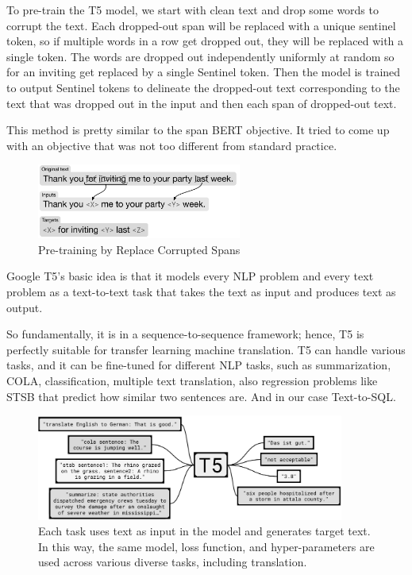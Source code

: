 To pre-train the T5 model, we start with clean text and drop some words to corrupt the text. Each dropped-out span will be replaced with a unique sentinel token, so if multiple words in a row get dropped out, they will be replaced with a single token. The words are dropped out independently uniformly at random so for an inviting get replaced by a single Sentinel token. Then the model is trained to output Sentinel tokens to delineate the dropped-out text corresponding to the text that was dropped out in the input and then each span of dropped-out text.

This method is pretty similar to the span BERT objective. It tried to come up with an objective that was not too different from standard practice.

\begin{figure}[H]
    \centering
    \includegraphics[width=0.6\textwidth]{pics/picard/t5-fine.png}
    \caption{Pre-training by Replace Corrupted Spans \cite{raffel_exploring_2020}}
\end{figure}

Google T5's basic idea is that it models every NLP problem and every text problem as a text-to-text task that takes the text as input and produces text as output.

So fundamentally, it is in a sequence-to-sequence framework; hence, T5 is perfectly suitable for transfer learning machine translation.
T5 can handle various tasks, and it can be fine-tuned for different NLP tasks, such as summarization, \ac{COLA}, classification, multiple text translation, also regression problems like STSB  that predict how similar two sentences are. And in our case Text-to-SQL.

\begin{figure}[H]
    \centering
    \includegraphics[width=0.9\textwidth]{pics/picard/t5-task.png}
    \caption{Each task uses text as input in the model and generates target text. In this way, the same model, loss function, and hyper-parameters are used across various diverse tasks, including translation. \cite{raffel_exploring_2020}}
\end{figure}

